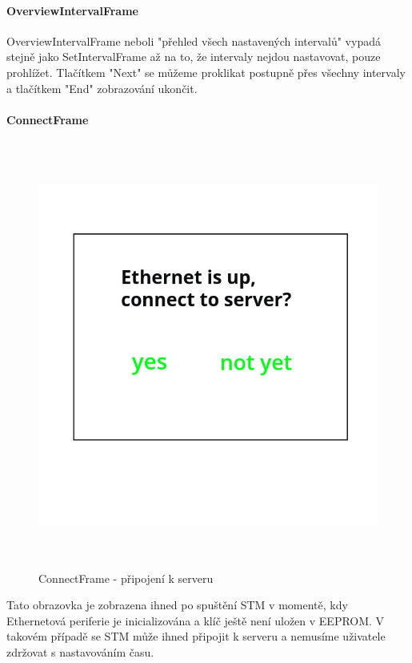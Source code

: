\paragraph{OverviewIntervalFrame}
OverviewIntervalFrame neboli "přehled všech nastavených intervalů" vypadá stejně jako SetIntervalFrame
až na to, že intervaly nejdou nastavovat, pouze prohlížet.
Tlačítkem "Next" se můžeme proklikat postupně přes všechny intervaly a tlačítkem "End" zobrazování
ukončit.

\paragraph{ConnectFrame}
\begin{figure}[H]\centering
\includegraphics[width=140mm, height=140mm]{../img/connect_frame.jpg}
\caption{ConnectFrame - připojení k serveru}
\label{connect-frame}
\end{figure}

Tato obrazovka je zobrazena ihned po spuštění STM v momentě, kdy Ethernetová periferie je inicializována
a klíč ještě není uložen v EEPROM.
V takovém případě se STM může ihned připojit k serveru a nemusíme uživatele zdržovat s nastavováním
času.

